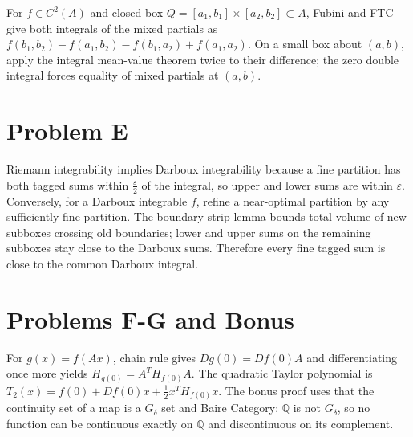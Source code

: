 For \(f \in C^{2}(A)\) and closed box \(Q = \left\lbrack {a_{1},b_{1}} \right\rbrack \times \left\lbrack {a_{2},b_{2}} \right\rbrack \subset A\), Fubini and FTC give both integrals of the mixed partials as \(f\left( {b_{1},b_{2}} \right) - f\left( {a_{1},b_{2}} \right) - f\left( {b_{1},a_{2}} \right) + f\left( {a_{1},a_{2}} \right)\). On a small box about \(\left( {a,b} \right)\), apply the integral mean-value theorem twice to their difference; the zero double integral forces equality of mixed partials at \(\left( {a,b} \right)\).

\section{Problem E}

Riemann integrability implies Darboux integrability because a fine partition has both tagged sums within \(\frac{\varepsilon}{2}\) of the integral, so upper and lower sums are within \(\varepsilon\). Conversely, for a Darboux integrable \(f\), refine a near-optimal partition by any sufficiently fine partition. The boundary-strip lemma bounds total volume of new subboxes crossing old boundaries; lower and upper sums on the remaining subboxes stay close to the Darboux sums. Therefore every fine tagged sum is close to the common Darboux integral.

\section{Problems F-G and Bonus}

For \(g(x) = f\left( {Ax} \right)\), chain rule gives \(Dg(0) = Df(0)A\) and differentiating once more yields \(H_{g{(0)}} = A^{T}H_{f{(0)}}A\). The quadratic Taylor polynomial is \(T_{2}(x) = f(0) + Df(0)x + \frac{1}{2}x^{T}H_{f{(0)}}x\). The bonus proof uses that the continuity set of a map is a \(G_{\delta}\) set and Baire Category: \(\mathbb{Q}\) is not \(G_{\delta}\), so no function can be continuous exactly on \(\mathbb{Q}\) and discontinuous on its complement.
